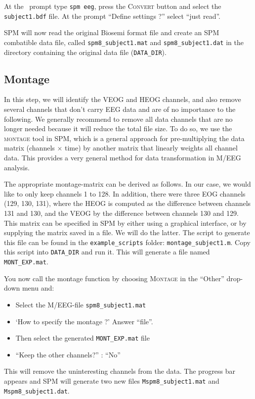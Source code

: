 At the \matlab\ prompt type \texttt{spm eeg}, press the \textsc{Convert} button and select the \texttt{subject1.bdf} file. At the prompt ``Define settings ?'' select ``just read''.

SPM will now read the original Biosemi format file and create an SPM combatible data file, called \texttt{spm8\_subject1.mat} and \texttt{spm8\_subject1.dat} in the directory containing the original data file (\texttt{DATA\_DIR}).

\subsection{Montage}

In this step, we will identify the VEOG and HEOG channels, and also remove several channels that don't carry EEG data and are of no importance to the following. We generally recommend to remove all data channels that are no longer needed because it will reduce the total file size. To do so, we use the \textsc{montage} tool in SPM, which is a general approach for pre-multiplying the data matrix (channels $\times$ time) by another matrix that linearly weights all channel data. This provides a very general method for data transformation in M/EEG analysis.

The appropriate montage-matrix can be derived as follows.
In our case, we would like to only keep channels 1 to 128. In addition, there were three EOG channels (129, 130, 131), where the HEOG is computed as the difference between channels 131 and 130, and the VEOG by the difference between channels 130 and 129. This matrix can be specified in SPM by either using a graphical interface, or by supplying the matrix saved in a file. We will do the latter. The script to generate this file can be found in the \texttt{example\_scripts} folder: \texttt{montage\_subject1.m}. Copy this script into \texttt{DATA\_DIR} and run it. This will generate a file named \texttt{MONT\_EXP.mat}.

You now call the montage function by choosing \textsc{Montage} in the ``Other'' drop-down menu and:
\begin{itemize}
\item{Select the M/EEG-file \texttt{spm8\_subject1.mat}}
\item{`How to specify the montage ?' Answer ``file''.}
\item{Then select the generated \texttt{MONT\_EXP.mat} file}
\item{``Keep the other channels?'' : ``No''}
\end{itemize}
This will remove the uninteresting channels from the data. The progress bar appears and SPM will generate two new files \texttt{Mspm8\_subject1.mat} and \texttt{Mspm8\_subject1.dat}.

